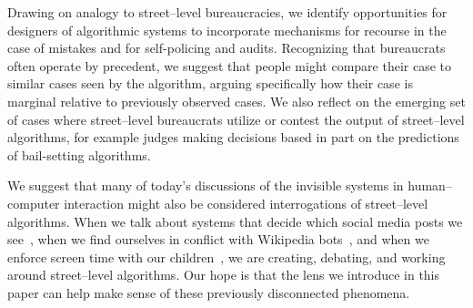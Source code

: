 \documentclass[main]{subfiles}
\begin{document}
Drawing on analogy to street--level bureaucracies, we identify opportunities for designers of algorithmic systems to incorporate mechanisms for recourse in the case of mistakes and for self-policing and audits.
Recognizing that bureaucrats often operate by precedent, we suggest that
people might compare their case to similar cases seen by the algorithm,
arguing specifically how their case is marginal relative to previously observed cases.
We also reflect on the emerging set of cases where street--level bureaucrats utilize or contest the output of street--level algorithms, for example judges making decisions based in part on the predictions of bail-setting algorithms.

We suggest that many of today's discussions of the invisible systems in human--computer interaction might also be considered interrogations of street--level algorithms.
When we talk about systems that decide which social media posts we see~\cite{Eslami:2015:IAA:2702123.2702556},
when we find ourselves in conflict with Wikipedia bots~\cite{geiger2018lives,Geiger:2013:LBW:2491055.2491061},
and when we enforce screen time with our children~\cite{Hiniker:2016:STT:2858036.2858278},
we are creating, debating, and working around street--level algorithms.
Our hope is that the lens we introduce in this paper can help make sense of these previously disconnected phenomena.


%   
%   
\end{document}
